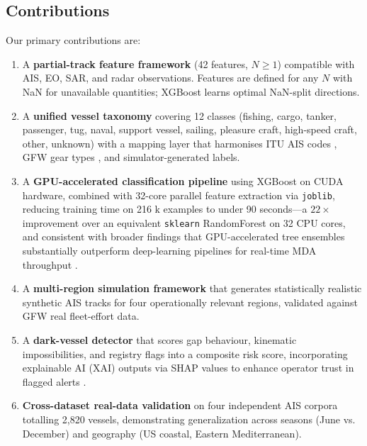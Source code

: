 \documentclass[journal]{IEEEtran}
\begin{document}
\subsection{Contributions}

Our primary contributions are:

\begin{enumerate}
  \item A \textbf{partial-track feature framework} (42 features, $N \geq 1$)
        compatible with AIS, EO, SAR, and radar observations. Features are
        defined for any $N$ with NaN for unavailable quantities; XGBoost
        learns optimal NaN-split directions.

  \item A \textbf{unified vessel taxonomy} covering 12 classes (fishing,
        cargo, tanker, passenger, tug, naval, support vessel, sailing,
        pleasure craft, high-speed craft, other, unknown) with a mapping
        layer that harmonises ITU AIS codes \cite{itu_ais2014}, GFW gear
        types \cite{kroodsma2018tracking}, and simulator-generated labels.

  \item A \textbf{GPU-accelerated classification pipeline} using XGBoost
        on CUDA hardware, combined with 32-core parallel feature extraction
        via \texttt{joblib}, reducing training time on 216 k examples to
        under 90 seconds—a $22\times$ improvement over an equivalent
        \texttt{sklearn} RandomForest on 32 CPU cores, and consistent
        with broader findings that GPU-accelerated tree ensembles
        substantially outperform deep-learning pipelines for real-time
        MDA throughput \cite{theodoropoulos2025flp}.

  \item A \textbf{multi-region simulation framework} that generates
        statistically realistic synthetic AIS tracks for four operationally
        relevant regions, validated against GFW real fleet-effort data.

  \item A \textbf{dark-vessel detector} that scores gap behaviour, kinematic
        impossibilities, and registry flags into a composite risk score,
        incorporating explainable AI (XAI) outputs via SHAP values to
        enhance operator trust in flagged alerts \cite{ratnasari2025design}.

  \item \textbf{Cross-dataset real-data validation} on four independent AIS
        corpora totalling 2,820 vessels, demonstrating generalization across
        seasons (June vs. December) and geography (US coastal, Eastern
        Mediterranean).
\end{enumerate}
\end{document}
